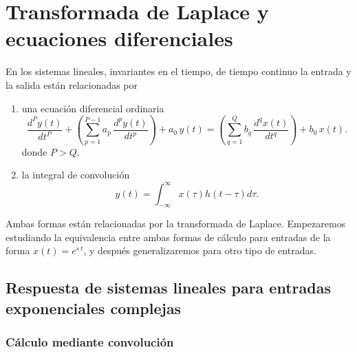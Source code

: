\chapter{Transformada de Laplace y ecuaciones diferenciales}

En los sistemas lineales, invariantes en el tiempo, de tiempo continuo
la entrada y la salida est\'{a}n relacionadas por 

\begin{enumerate}
	\item   una ecuaci\'{o}n diferencial ordinaria 
	\begin{equation}
		\frac{d^{P}y\left( t\right) }{dt^{P}} +
		\left(\sum_{p=1}^{P-1}a_{p} \, \frac{d^{p}y\left( t\right) }{dt^{p}}\right) + 
		a_{0} \, y(t) =
		\left(\sum_{q=1}^{Q}b_{q} \, \frac{d^{q}x\left( t\right) }{dt^{q}}\right) + 
		b_{0} \, x(t).
	\end{equation}
	donde $P > Q$.
	
	\item   la integral de convoluci\'{o}n
	\begin{equation}
		y\left( t\right) = \int_{-\infty }^{\infty} x\left( \tau \right) h\left( t-\tau \right) d\tau.
	\end{equation}
\end{enumerate}

Ambas formas están relacionadas por la transformada de Laplace. Empezaremos estudiando la equivalencia entre ambas formas de cálculo para entradas de la forma $x(t) = e^{s \,  t}$, y despu\'{e}s generalizaremos para otro tipo de entradas.

\section{Respuesta de sistemas lineales para entradas exponenciales complejas}

\subsection{C\'{a}lculo mediante convoluci\'{o}n}

